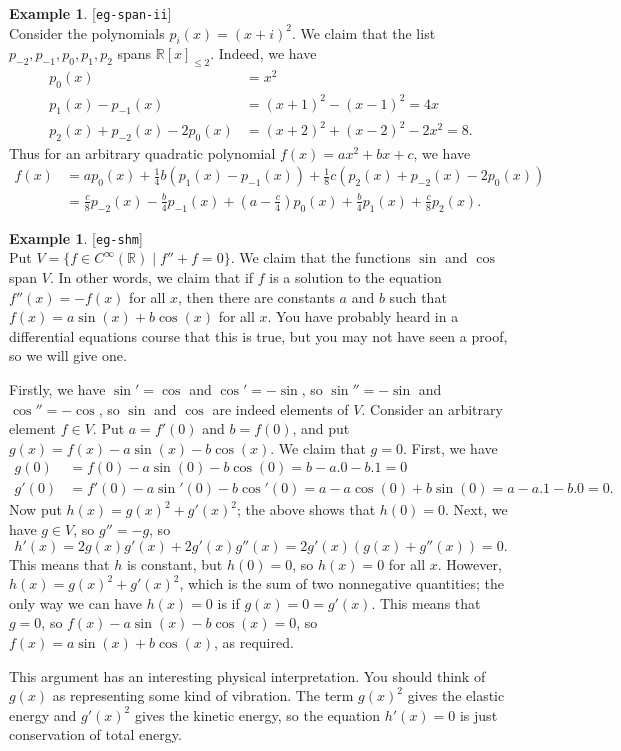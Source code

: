 \documentclass{amsart}
\newcommand{\lbl}[1]{\label{#1}\textup{[\texttt{#1}]}\ \\}
\newcommand{\lbl}{\label}
\newcommand{\R}         {{\mathbb{R}}}
\newcommand{\st}        {\;|\;}
\renewcommand{\:}       {\colon}
\theoremstyle{definition}
\newtheorem{example}[theorem]{Example}
\begin{document}
\begin{example}\lbl{eg-span-ii}
 Consider the polynomials $p_i(x)=(x+i)^2$.  We claim that
 the list $p_{-2},p_{-1},p_0,p_1,p_2$ spans
 $\R[x]_{\leq 2}$.  Indeed, we have
 \begin{align*}
  p_0(x) &= x^2 \\
  p_1(x) - p_{-1}(x) &= (x+1)^2 - (x-1)^2 = 4x \\
  p_2(x) + p_{-2}(x) - 2p_0(x) &= (x+2)^2 + (x-2)^2 - 2x^2 = 8.
 \end{align*}
 Thus for an arbitrary quadratic polynomial
 $f(x)=ax^2+bx+c$, we have
 \begin{align*}
  f(x) &= a p_0(x) + \tfrac{1}{4}b(p_1(x)-p_{-1}(x)) + 
          \tfrac{1}{8}c(p_2(x) + p_{-2}(x) - 2p_0(x)) \\
       &= \tfrac{c}{8}p_{-2}(x) - \tfrac{b}{4}p_{-1}(x) +
          (a-\tfrac{c}{4})p_0(x) +
          \tfrac{b}{4}p_1(x) + \tfrac{c}{8}p_2(x).
 \end{align*}
\end{example}
\begin{example}\lbl{eg-shm}
 Put $V=\{f\in C^\infty(\R)\st f''+f=0\}$.  We claim that
 the functions $\sin$ and $\cos$ span $V$.  In other words,
 we claim that if $f$ is a solution to the equation
 $f''(x)=-f(x)$ for all $x$, then there are constants $a$
 and $b$ such that $f(x)=a\sin(x)+b\cos(x)$ for all $x$.
 You have probably heard in a differential equations course
 that this is true, but you may not have seen a proof, so we
 will give one.

 Firstly, we have $\sin'=\cos$ and $\cos'=-\sin$, so
 $\sin''=-\sin$ and $\cos''=-\cos$, so $\sin$ and $\cos$ are
 indeed elements of $V$.  Consider an arbitrary element
 $f\in V$.  Put $a=f'(0)$ and $b=f(0)$, and put
 $g(x)=f(x)-a\sin(x)-b\cos(x)$.  We claim that $g=0$.
 First, we have
 \begin{align*}
  g(0) &= f(0) - a\sin(0) -b\cos(0) = b -a.0 - b.1 = 0 \\
  g'(0) &= f'(0) - a\sin'(0) - b\cos'(0) 
         = a - a\cos(0) + b\sin(0) = a-a.1-b.0 = 0. 
 \end{align*}
 Now put $h(x)=g(x)^2+g'(x)^2$; the above shows that
 $h(0)=0$.  Next, we have $g\in V$, so $g''=-g$, so 
 \[ h'(x) = 2g(x)g'(x) + 2g'(x)g''(x) = 
      2g'(x)(g(x)+g''(x)) = 0.
 \]
 This means that $h$ is constant, but $h(0)=0$, so $h(x)=0$
 for all $x$.  However, $h(x)=g(x)^2+g'(x)^2$, which is the
 sum of two nonnegative quantities; the only way we can have
 $h(x)=0$ is if $g(x)=0=g'(x)$.  This means that $g=0$, so
 $f(x)-a\sin(x)-b\cos(x)=0$, so $f(x)=a\sin(x)+b\cos(x)$, as
 required. 

 This argument has an interesting physical interpretation.
 You should think of $g(x)$ as representing some kind of
 vibration.  The term $g(x)^2$ gives the elastic energy and
 $g'(x)^2$ gives the kinetic energy, so the equation
 $h'(x)=0$ is just conservation of total energy.
\end{example}
\end{document}
